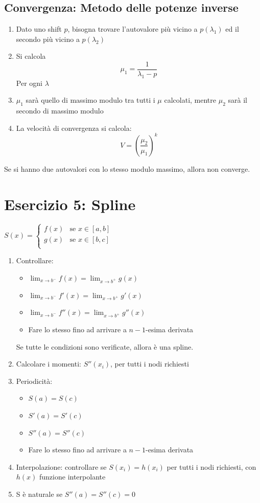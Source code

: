 \documentclass[10pt]{article}
\begin{document}
\subsection{Convergenza: Metodo delle potenze inverse}
\begin{enumerate}
    \item Dato uno shift $p$, bisogna trovare l'autovalore più vicino a $p(\lambda_{1})$ ed il secondo più vicino a $p(\lambda_{2})$
    \item Si calcola \begin{equation*}
        \mu_{1} = \frac{1}{\lambda_{1}-p}
    \end{equation*}
    Per ogni $\lambda$
    \item $\mu_{1}$ sarà quello di massimo modulo tra tutti i $\mu$ calcolati, mentre $\mu_{2}$ sarà il secondo di massimo modulo
    \item La velocità di convergenza si calcola: \begin{equation*}
        V = \left(\frac{\mu_{2}}{\mu_{1}}\right)^{k}
    \end{equation*}
\end{enumerate}
Se si hanno due autovalori con lo stesso modulo massimo, allora non converge.
\section{Esercizio 5: Spline}
$S(x)=\begin{cases}
    f(x) & \text{se } x\in [a,b]\\
    g(x) & \text{se } x\in [b,c]\\
\end{cases}$
\begin{enumerate}
    \item Controllare: \begin{itemize}
        \item $\lim_{x\to b^{-}} f(x) = \lim_{x\to b^{+}} g(x)$
        \item $\lim_{x\to b^{-}} f'(x) = \lim_{x\to b^{+}} g'(x)$
        \item $\lim_{x\to b^{-}} f''(x) = \lim_{x\to b^{+}} g''(x)$
        \item Fare lo stesso fino ad arrivare a $n-1$-esima derivata
    \end{itemize} Se tutte le condizioni sono verificate, allora è una spline.
    \item Calcolare i momenti: $S''(x_{i})$, per tutti i nodi richiesti 
    \item Periodicità: \begin{itemize}
        \item $S(a)=S(c)$
        \item $S'(a)=S'(c)$
        \item $S''(a)=S''(c)$
        \item Fare lo stesso fino ad arrivare a $n-1$-esima derivata
    \end{itemize}
    \item Interpolazione: controllare se $S(x_{i})=h(x_{i})$ per tutti i nodi richiesti, con $h(x)$ funzione interpolante
    \item S è naturale se $S''(a)=S''(c)=0$
\end{enumerate}
\end{document}
